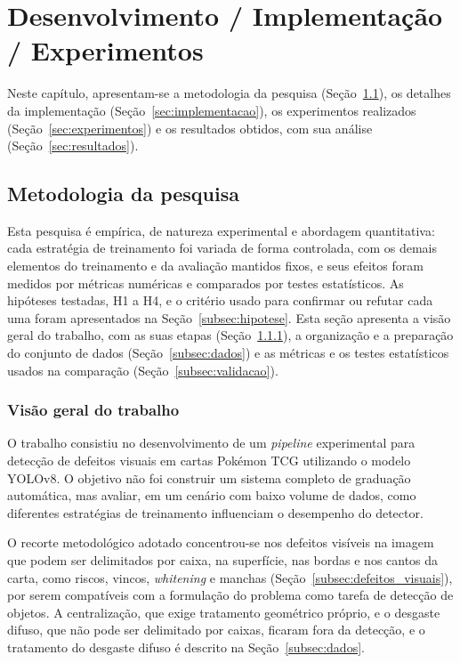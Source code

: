 \documentclass[
    12pt,                %
    openright,           %
    oneside,             %
    a4paper,             %
    english,             %
    brazil               %
]{abntex2}
\begin{document}
\chapter{Desenvolvimento / Implementação / Experimentos}
\label{cap:desenvolvimento}

Neste capítulo, apresentam-se a metodologia da pesquisa (Seção~\ref{sec:metodologia_pesquisa}), os detalhes da implementação (Seção~\ref{sec:implementacao}), os experimentos realizados (Seção~\ref{sec:experimentos}) e os resultados obtidos, com sua análise (Seção~\ref{sec:resultados}).

\section{Metodologia da pesquisa}
\label{sec:metodologia_pesquisa}

Esta pesquisa é empírica, de natureza experimental e abordagem
quantitativa: cada estratégia de treinamento foi variada de forma
controlada, com os demais elementos do treinamento e da avaliação
mantidos fixos, e seus efeitos foram medidos por métricas numéricas e
comparados por testes estatísticos. As hipóteses testadas, H1 a H4, e
o critério usado para confirmar ou refutar cada uma foram apresentados
na Seção~\ref{subsec:hipotese}. Esta seção apresenta a visão geral do
trabalho, com as suas etapas
(Seção~\ref{subsec:visao_geral}), a organização e a preparação do
conjunto de dados (Seção~\ref{subsec:dados}) e as métricas e os
testes estatísticos usados na comparação (Seção~\ref{subsec:validacao}).

\subsection{Visão geral do trabalho}
\label{subsec:visao_geral}

O trabalho consistiu no desenvolvimento de um \textit{pipeline}
experimental para detecção de defeitos visuais em cartas Pokémon TCG
utilizando o modelo YOLOv8. O objetivo não foi construir um sistema
completo de graduação automática, mas avaliar, em um cenário com baixo
volume de dados, como diferentes estratégias de treinamento influenciam
o desempenho do detector.

O recorte metodológico adotado concentrou-se nos defeitos visíveis na
imagem que podem ser delimitados por caixa, na superfície, nas bordas e
nos cantos da carta, como riscos, vincos, \textit{whitening} e manchas
(Seção~\ref{subsec:defeitos_visuais}), por serem compatíveis com a
formulação do problema como tarefa de detecção de objetos. A
centralização, que exige tratamento geométrico próprio, e o desgaste
difuso, que não pode ser delimitado por caixas, ficaram fora da
detecção, e o tratamento do desgaste difuso é descrito na
Seção~\ref{subsec:dados}.
\end{document}
